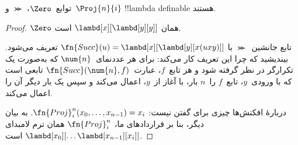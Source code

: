 \documentclass[../../../include/open-logic-section]{subfiles}
\begin{document}

\begin{lem}
توابع~$\Zero$، $\Succ$ و~$\Proj{n}{i}$ !!{lambda definable} هستند.
\end{lem}

\begin{proof}
$\Zero$ همان
$\lambd[x][\lambd[y][y]]$ است.

تابع جانشین~$\Succ$ با
$\fn{Succ}(u) = \lambd[x][\lambd[y][x(uxy)]]$ تعریف می‌شود. بیندیشید
که چرا این تعریف کار می‌کند: برای هر عددنمای~$\num{n}$ که به‌صورت یک
تکرارگر در نظر گرفته شود و هر تابع~$f$، عبارت~$\fn{Succ}(\num{n},f)$
تابعی است که با ورودی~$y$، تابع~$f$ را~$n$ بار، با آغاز از~$y$، اعمال
می‌کند و سپس یک بار دیگر آن را اعمال می‌کند.

دربارهٔ افکنش‌ها چیزی برای گفتن نیست:
$\fn{Proj}^n_i(x_0, \dots, x_{n-1}) = x_i$. به بیان دیگر، بنا بر قراردادهای
ما، $\fn{Proj}^n_i$ همان ترم لامبدای
$\lambd[x_0][\dots \lambd[x_{n-1}][x_i]]$ است.
\end{proof}
\end{document}
